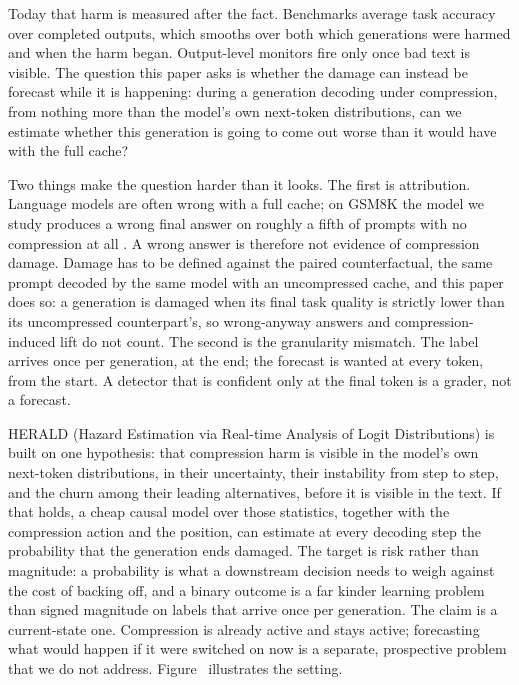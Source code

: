 Today that harm is measured after the fact. Benchmarks average task accuracy
over completed outputs, which smooths over both which generations were
harmed and when the harm began. Output-level monitors fire only once bad text
is visible. The question this paper asks is whether the damage can instead be
forecast while it is happening: during a generation decoding under
compression, from nothing more than the model's own next-token distributions,
can we estimate whether this generation is going to come out worse than it
would have with the full cache?

Two things make the question harder than it looks. The first is attribution.
Language models are often wrong with a full cache; on GSM8K the model we
study produces a wrong final answer on roughly a fifth of prompts with no
compression at all . A
wrong answer is therefore not evidence of compression damage. Damage has to
be defined against the paired counterfactual, the same prompt decoded by the
same model with an uncompressed cache, and this paper does so: a generation
is damaged when its final task quality is strictly lower than its
uncompressed counterpart's, so wrong-anyway answers and compression-induced
lift do not count. The second is the granularity mismatch. The label arrives
once per generation, at the end; the forecast is wanted at every token, from
the start. A detector that is confident only at the final token is a grader,
not a forecast.

HERALD (Hazard Estimation via Real-time Analysis of Logit Distributions) is
built on one hypothesis: that compression harm is visible in the model's own
next-token distributions, in their uncertainty, their instability from step
to step, and the churn among their leading alternatives, before it is visible
in the text. If that holds, a cheap causal model over those statistics,
together with the compression action and the position, can estimate at every
decoding step the probability that the generation ends damaged. The target is
risk rather than magnitude: a probability is what a downstream decision needs
to weigh against the cost of backing off, and a binary outcome is a far
kinder learning problem than signed magnitude on labels that arrive once per
generation. The claim is a current-state one. Compression is already active
and stays active; forecasting what would happen if it were switched on now is
a separate, prospective problem that we do not address.
Figure~ illustrates the setting.

